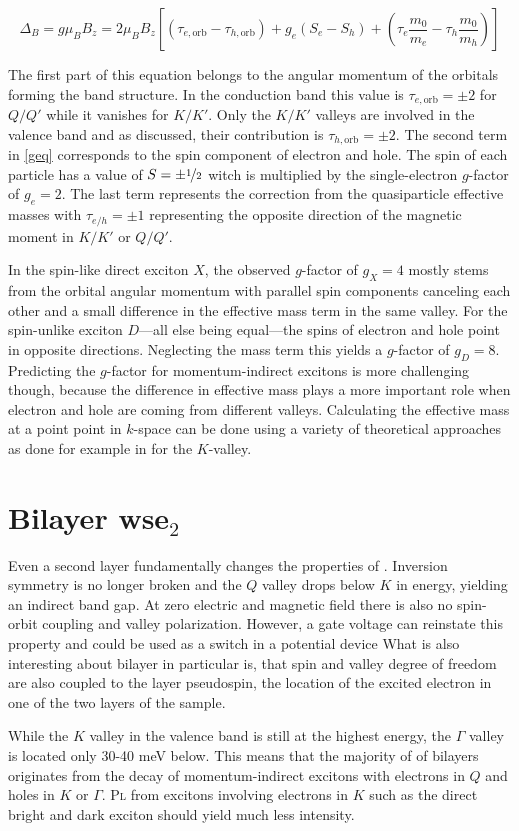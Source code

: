 \[\Delta_B=g\mu_BB_z = 2\mu_BB_z\left[(\tau_{e, \mathrm{orb}}-\tau_{h, \mathrm{orb}})+g_e(S_e-S_h) + \left(\tau_e \frac{m_0}{m_e}-\tau_h \frac{m_0}{m_h}\right)\right]\label{geq}\]

The first part of this equation belongs to the angular momentum of the orbitals forming the band structure. In the conduction band this value is $\tau_{e, \mathrm{orb}}=\pm2$ for $Q/Q'$ while it vanishes for $K/K'$. Only the $K/K'$ valleys are involved in the valence band and as discussed, their contribution is $\tau_{h, \mathrm{orb}}=\pm2$. The second term in \eqref{geq} corresponds to the spin component of electron and hole. The spin of each particle has a value of $S=\pm\nicefrac{1}{2}$ witch is multiplied by the single-electron $g$-factor of $g_e=2$. The last term represents the correction from the quasiparticle effective masses with $\tau_{e/h}=\pm1$ representing the opposite direction of the magnetic moment in $K/K'$ or $Q/Q'$.

In the spin-like direct exciton $X$, the observed $g$-factor of $g_X=4$ mostly stems from the orbital angular momentum with parallel spin components canceling each other and a small difference in the effective mass term in the same valley. For the spin-unlike exciton $D$---all else being equal---the spins of electron and hole point in opposite directions. Neglecting the mass term this yields a $g$-factor of $g_D=8$. Predicting the $g$-factor for momentum-indirect excitons is more challenging though, because the difference in effective mass plays a more important role when electron and hole are coming from different valleys. Calculating the effective mass at a point point in $k$-space can be done using a variety of theoretical approaches as done for example in \cite{rybkovskiy_atomically_2017} for the $K$-valley.

\section{Bilayer ws\textup{e}$_2$}\label{bilayer_theory}

Even a second layer fundamentally changes the properties of \wse\!. Inversion symmetry is no longer broken and the $Q$ valley drops below $K$ in energy, yielding an indirect band gap\cite{zibouche_transition-metal_2014_2}. At zero electric and magnetic field there is also no spin-orbit coupling and valley polarization. However, a gate voltage can reinstate this property and could be used as a switch in a potential device\cite{zibouche_transition-metal_2014} What is also interesting about bilayer \wse in particular is, that spin and valley degree of freedom are also coupled to the layer pseudospin, the location of the excited electron in one of the two layers of the sample\cite{jones_spin-layer_2014}.

While the $K$ valley in the valence band is still at the highest energy, the $\Gamma$ valley is located only 30-40 meV below. This means that the majority of \pl of \wse bilayers originates from the decay of momentum-indirect excitons with electrons in $Q$ and holes in $K$ or $\Gamma$. \textsc{Pl} from excitons involving electrons in $K$ such as the direct bright and dark exciton should yield much less intensity.